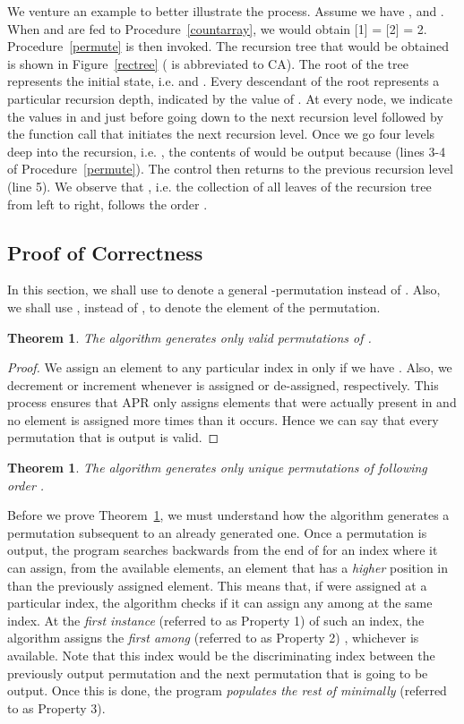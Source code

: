 \documentclass{article}
\newtheorem{theorem}[defn]{Theorem}
\begin{document}
 We venture an example to better illustrate the process. Assume we have ,  and . When  and  are fed to Procedure~\ref{countarray}, we would obtain [1] = [2] = 2. Procedure~\ref{permute} is then invoked. The recursion tree that would be obtained is shown in Figure~\ref{rectree} ( is abbreviated to CA). The root of the tree represents the initial state, i.e.  and . Every descendant of the root represents a particular recursion depth, indicated by the value of . At every node, we indicate the values in  and  just before going down to the next recursion level followed by the function call that initiates the next recursion level. Once we go four levels deep into the recursion, i.e. , the contents of  would be output because  (lines 3-4 of Procedure~\ref{permute}). The control then returns to the previous recursion level (line 5). We observe that , i.e. the collection of all leaves of the recursion tree from left to right, follows the order .

\subsection{Proof of Correctness}
\label{subsec:proof}

In this section, we shall use  to denote a general -permutation instead of . Also, we shall use , instead of , to denote the  element of the  permutation.

\begin{theorem}
 The algorithm generates only valid permutations of .
\end{theorem}

\begin{proof}
 We assign an element  to any particular index in  only if we have . Also, we decrement or increment  whenever  is assigned or de-assigned, respectively. This process ensures that APR only assigns elements that were actually present in  and no element is assigned more times than it occurs. Hence we can say that every permutation that is output is valid.\end{proof}

\begin{theorem}
\label{thm:unique_order}
The algorithm generates only unique permutations of  following order .
\end{theorem}

Before we prove Theorem~\ref{thm:unique_order}, we must understand how the algorithm generates a permutation subsequent to an already generated one. Once a permutation is output, the program searches backwards from the end of  for an index where it can assign, from the available elements, an element that has a \emph{higher} position in  than the previously assigned element. This means that, if  were assigned at a particular index, the algorithm checks if it can assign any among  at the same index. At the \emph{first instance} (referred to as Property 1) of such an index, the algorithm assigns the \emph{first among} (referred to as Property 2) , whichever is available. Note that this index would be the discriminating index between the previously output permutation and the next permutation that is going to be output. Once this is done, the program \emph{populates the rest of  minimally} (referred to as Property 3).
\end{document}
